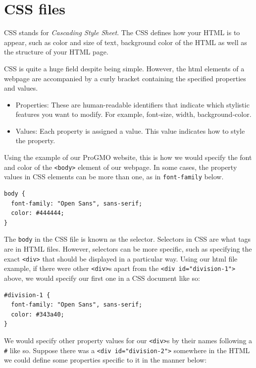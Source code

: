 \documentclass[
]{book}
\begin{document}
\hypertarget{css-files}{%
\section{CSS files}\label{css-files}}

CSS stands for \emph{Cascading Style Sheet}. The CSS defines how your HTML is to appear, such as color and size of text, background color of the HTML as well as the structure of your HTML page.

CSS is quite a huge field despite being simple. However, the html elements of a webpage are accompanied by a curly bracket containing the specified properties and values.

\begin{itemize}
\item
  Properties: These are human-readable identifiers that indicate which stylistic features you want to modify. For example, font-size, width, background-color.
\item
  Values: Each property is assigned a value. This value indicates how to style the property.
\end{itemize}

Using the example of our ProGMO website, this is how we would specify the font and color of the \texttt{\textless{}body\textgreater{}} element of our webpage. In some cases, the property values in CSS elements can be more than one, as in \texttt{font-family} below.

\begin{verbatim}
body {
  font-family: "Open Sans", sans-serif;
  color: #444444;
}
\end{verbatim}

The \texttt{body} in the CSS file is known as the selector. Selectors in CSS are what tags are in HTML files. However, selectors can be more specific, such as specifying the exact \texttt{\textless{}div\textgreater{}} that should be displayed in a particular way. Using our html file example, if there were other \texttt{\textless{}div\textgreater{}}s apart from the \texttt{\textless{}div\ id="division-1"\textgreater{}} above, we would specify our first one in a CSS document like so:

\begin{verbatim}
#division-1 {
  font-family: "Open Sans", sans-serif;
  color: #343a40;
}
\end{verbatim}

We would specify other property values for our \texttt{\textless{}div\textgreater{}}s by their names following a \texttt{\#} like so. Suppose there was a \texttt{\textless{}div\ id="division-2"\textgreater{}} somewhere in the HTML we could define some properties specific to it in the manner below:
\end{document}
